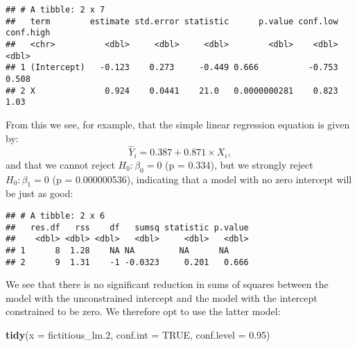 \documentclass[
]{book}
\newenvironment{Shaded}{\begin{snugshade}}{\end{snugshade}}
\newcommand{\CommentTok}[1]{\textcolor[rgb]{0.56,0.35,0.01}{\textit{#1}}}
\newcommand{\DataTypeTok}[1]{\textcolor[rgb]{0.13,0.29,0.53}{#1}}
\newcommand{\DecValTok}[1]{\textcolor[rgb]{0.00,0.00,0.81}{#1}}
\newcommand{\FloatTok}[1]{\textcolor[rgb]{0.00,0.00,0.81}{#1}}
\newcommand{\KeywordTok}[1]{\textcolor[rgb]{0.13,0.29,0.53}{\textbf{#1}}}
\newcommand{\NormalTok}[1]{#1}
\newcommand{\OperatorTok}[1]{\textcolor[rgb]{0.81,0.36,0.00}{\textbf{#1}}}
\newcommand{\OtherTok}[1]{\textcolor[rgb]{0.56,0.35,0.01}{#1}}
\newcommand{\StringTok}[1]{\textcolor[rgb]{0.31,0.60,0.02}{#1}}
\begin{document}
\begin{verbatim}
## # A tibble: 2 x 7
##   term        estimate std.error statistic      p.value conf.low conf.high
##   <chr>          <dbl>     <dbl>     <dbl>        <dbl>    <dbl>     <dbl>
## 1 (Intercept)   -0.123    0.273     -0.449 0.666          -0.753     0.508
## 2 X              0.924    0.0441    21.0   0.0000000281    0.823     1.03
\end{verbatim}

From this we see, for example, that the simple linear regression equation is given by:
\[
\hat Y_i = 0.387 + 0.871\times X_i,  
\]
and that we cannot reject \(H_0: \beta_0=0\) (p = 0.334), but we strongly reject \(H_0:\beta_1 = 0\) (p = 0.000000536), indicating that a model with no zero intercept will be just as good:

\begin{Shaded}
\end{Shaded}

\begin{verbatim}
## # A tibble: 2 x 6
##   res.df   rss    df   sumsq statistic p.value
##    <dbl> <dbl> <dbl>   <dbl>     <dbl>   <dbl>
## 1      8  1.28    NA NA         NA      NA    
## 2      9  1.31    -1 -0.0323     0.201   0.666
\end{verbatim}

We see that there is no significant reduction in sums of squares between the model with the unconstrained intercept and the model with the intercept constrained to be zero. We therefore opt to use the latter model:

\begin{Shaded}
\begin{Highlighting}[]
\KeywordTok{tidy}\NormalTok{(}\DataTypeTok{x =}\NormalTok{ fictitious_lm}\FloatTok{.2}\NormalTok{,}
     \DataTypeTok{conf.int =} \OtherTok{TRUE}\NormalTok{,}
     \DataTypeTok{conf.level =} \FloatTok{0.95}\NormalTok{)}
\end{Highlighting}
\end{Shaded}
\end{document}
